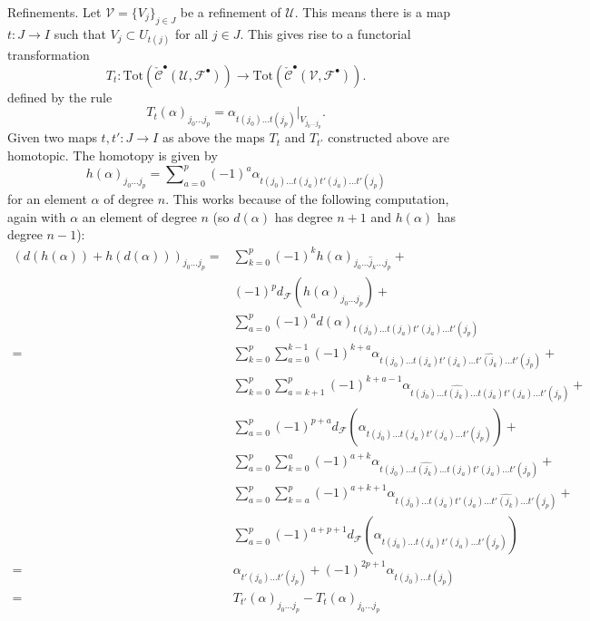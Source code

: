 \medskip\noindent
Refinements. Let ${\mathcal V} = \{ V_j \}_{j\in J}$ be a
refinement of ${\mathcal U}$. This means there is a map $t: J \to I$
such that $V_j \subset U_{t(j)}$ for all $j\in J$. This gives
rise to a functorial transformation
\begin{equation}
\label{equation-transformation}
T_t :
\text{Tot}(\check{\mathcal{C}}^\bullet({\mathcal U}, {\mathcal F}^\bullet))
\longrightarrow
\text{Tot}(\check{\mathcal{C}}^\bullet({\mathcal V}, {\mathcal F}^\bullet)).
\end{equation}
defined by the rule
$$
T_t(\alpha)_{j_0\ldots j_p}
=
\alpha_{t(j_0)\ldots t(j_p)}|_{V_{j_0\ldots j_p}}.
$$
Given two maps $t, t' : J \to I$ as above the maps
$T_t$ and $T_{t'}$ constructed above are homotopic.
The homotopy is given by
$$
h(\alpha)_{j_0\ldots j_p}
=
\sum\nolimits_{a = 0}^{p}
(-1)^a
\alpha_{t(j_0)\ldots t(j_a) t'(j_a) \ldots t'(j_p)}
$$
for an element $\alpha$ of degree $n$. This works
because of the following computation, again with
$\alpha$ an element of degree $n$ (so $d(\alpha)$
has degree $n + 1$ and $h(\alpha)$ has degree $n - 1$):
\begin{align*}
(
d(h(\alpha)) + h(d(\alpha))
)_{j_0\ldots j_p}
= &
\sum\nolimits_{k = 0}^p
(-1)^k
h(\alpha)_{j_0 \ldots \hat j_k \ldots j_p}
+ \\
&
(-1)^p
d_{\mathcal F}(h(\alpha)_{j_0 \ldots j_p})
+ \\
&
\sum\nolimits_{a = 0}^p
(-1)^a
d(\alpha)_{t(j_0) \ldots t(j_a) t'(j_a) \ldots t'(j_p)}
\\
= &
\sum\nolimits_{k = 0}^p
\sum\nolimits_{a = 0}^{k - 1}
(-1)^{k + a}
\alpha_{t(j_0)\ldots t(j_a)t'(j_a)\ldots \hat{t'(j_k)}\ldots t'(j_p)}
+ \\
&
\sum\nolimits_{k = 0}^p
\sum\nolimits_{a = k + 1}^p
(-1)^{k + a - 1}
\alpha_{t(j_0)\ldots \hat{t(j_k)}\ldots t(j_a)t'(j_a)\ldots t'(j_p)}
+ \\
&
\sum\nolimits_{a = 0}^p
(-1)^{p + a}
d_{\mathcal F}(\alpha_{t(j_0)\ldots t(j_a) t'(j_a) \ldots t'(j_p)})
+ \\
&
\sum\nolimits_{a = 0}^p
\sum\nolimits_{k = 0}^a
(-1)^{a + k}
\alpha_{t(j_0)\ldots\hat{t(j_k)}\ldots t(j_a)t'(j_a)\ldots t'(j_p)}
+ \\
&
\sum\nolimits_{a = 0}^p
\sum\nolimits_{k = a}^p
(-1)^{a + k + 1}
\alpha_{t(j_0) \ldots t(j_a) t'(j_a) \ldots \hat{t'(j_k)} \ldots t'(j_p)}
+ \\
&
\sum\nolimits_{a = 0}^p
(-1)^{a + p + 1}
d_{\mathcal F}(\alpha_{t(j_0)\ldots t(j_a) t'(j_a) \ldots t'(j_p)})
\\
= &
\alpha_{t'(j_0)\ldots t'(j_p)} +
(-1)^{2p + 1}\alpha_{t(j_0)\ldots t(j_p)}
\\
= &
T_{t'}(\alpha)_{j_0\ldots j_p} - T_t(\alpha)_{j_0\ldots j_p}
\end{align*}
